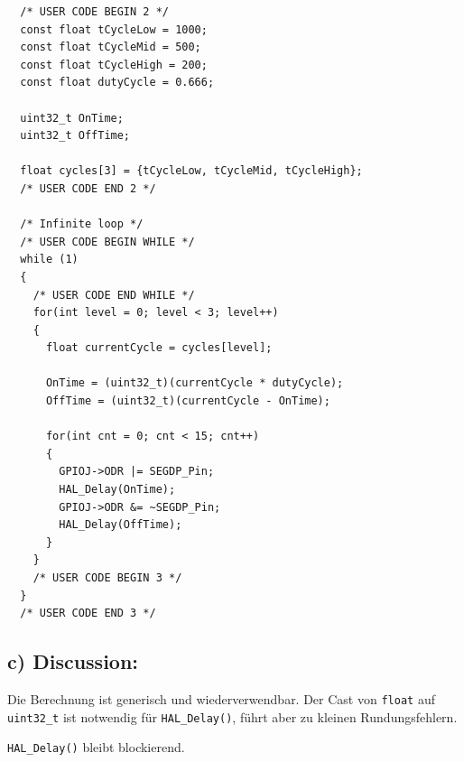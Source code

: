 \begin{lstlisting}
  /* USER CODE BEGIN 2 */
  const float tCycleLow = 1000;
  const float tCycleMid = 500;
  const float tCycleHigh = 200;
  const float dutyCycle = 0.666; 
  
  uint32_t OnTime;
  uint32_t OffTime; 

  float cycles[3] = {tCycleLow, tCycleMid, tCycleHigh};
  /* USER CODE END 2 */

  /* Infinite loop */
  /* USER CODE BEGIN WHILE */
  while (1)
  {
    /* USER CODE END WHILE */
    for(int level = 0; level < 3; level++)
    {
      float currentCycle = cycles[level];

      OnTime = (uint32_t)(currentCycle * dutyCycle);
      OffTime = (uint32_t)(currentCycle - OnTime);

      for(int cnt = 0; cnt < 15; cnt++)
      {
        GPIOJ->ODR |= SEGDP_Pin;
        HAL_Delay(OnTime);
        GPIOJ->ODR &= ~SEGDP_Pin;
        HAL_Delay(OffTime);
      }
    }
    /* USER CODE BEGIN 3 */
  }
  /* USER CODE END 3 */
\end{lstlisting}

\subsection{c) Discussion:}

Die Berechnung ist generisch und wiederverwendbar. Der Cast von \texttt{float} auf \texttt{uint32\_t} ist notwendig für \texttt{HAL\_Delay()}, führt aber zu kleinen Rundungsfehlern.

\texttt{HAL\_Delay()} bleibt blockierend.
